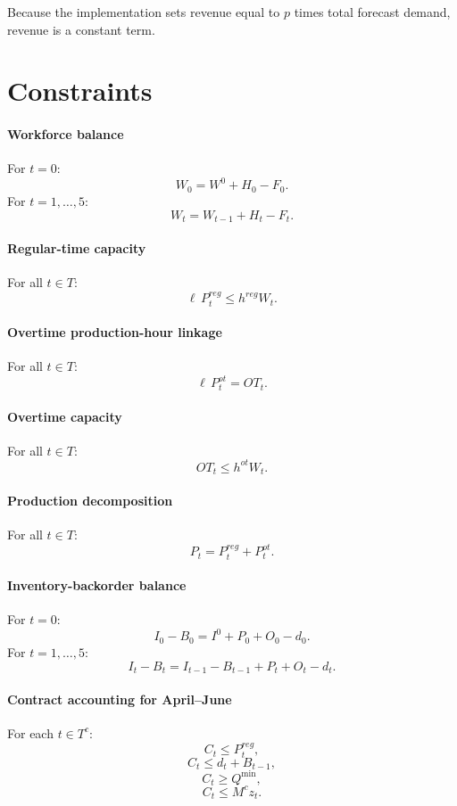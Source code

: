 Because the implementation sets revenue equal to \(p\) times total forecast demand, revenue is a constant term.

\section*{Constraints}

\paragraph{Workforce balance}
For \(t=0\):
\[
W_0 = W^0 + H_0 - F_0.
\]
For \(t=1,\dots,5\):
\[
W_t = W_{t-1} + H_t - F_t.
\]

\paragraph{Regular-time capacity}
For all \(t\in T\):
\[
\ell\, P^{reg}_t \le h^{reg} W_t.
\]

\paragraph{Overtime production-hour linkage}
For all \(t\in T\):
\[
\ell\, P^{ot}_t = OT_t.
\]

\paragraph{Overtime capacity}
For all \(t\in T\):
\[
OT_t \le h^{ot} W_t.
\]

\paragraph{Production decomposition}
For all \(t\in T\):
\[
P_t = P^{reg}_t + P^{ot}_t.
\]

\paragraph{Inventory-backorder balance}
For \(t=0\):
\[
I_0 - B_0 = I^0 + P_0 + O_0 - d_0.
\]
For \(t=1,\dots,5\):
\[
I_t - B_t = I_{t-1} - B_{t-1} + P_t + O_t - d_t.
\]

\paragraph{Contract accounting for April--June}
For each \(t\in T^c\):
\[
C_t \le P^{reg}_t,
\]
\[
C_t \le d_t + B_{t-1},
\]
\[
C_t \ge Q^{\min},
\]
\[
C_t \le M^{c} z_t.
\]

